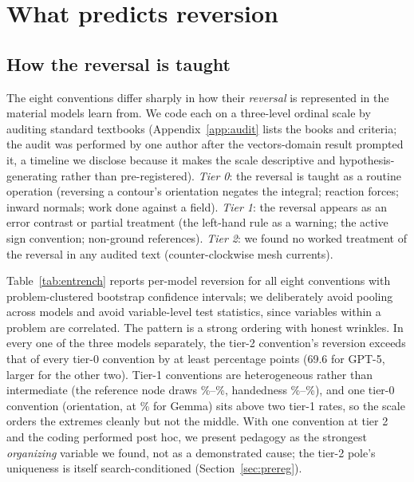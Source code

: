 \documentclass{article}
\begin{document}
\section{What predicts reversion}\label{sec:anatomy}

\subsection{How the reversal is taught}\label{sec:tier}
The eight conventions differ sharply in how their \emph{reversal} is represented
in the material models learn from. We code each on a three-level ordinal scale by
auditing standard textbooks (Appendix~\ref{app:audit} lists the books and
criteria; the audit was performed by one author after the vectors-domain result
prompted it, a timeline we disclose because it makes the scale descriptive and
hypothesis-generating rather than pre-registered). \emph{Tier 0}: the reversal is
taught as a routine operation (reversing a contour's orientation negates the
integral; reaction forces; inward normals; work done against a field).
\emph{Tier 1}: the reversal appears as an error contrast or partial treatment
(the left-hand rule as a warning; the active sign convention; non-ground
references). \emph{Tier 2}: we found no worked treatment of the reversal in any
audited text (counter-clockwise mesh currents).

Table~\ref{tab:entrench} reports per-model reversion for all eight conventions
with problem-clustered bootstrap confidence intervals; we deliberately avoid
pooling across models and avoid variable-level test statistics, since variables
within a problem are correlated. The pattern is a strong ordering with honest
wrinkles. In every one of the three models separately, the tier-2 convention's
reversion exceeds that of every tier-0 convention by at least \tierSepMinPrec{}
percentage points (69.6 for GPT-5, larger for the other two). Tier-1 conventions are heterogeneous rather than intermediate
(the reference node draws \topGptOss\%--\topGemma\%, handedness
\lhGptFive\%--\lhGemma\%), and one tier-0 convention (orientation, at
\cwGemma\% for Gemma) sits above two tier-1 rates, so the scale orders the
extremes cleanly but not the middle. With one convention at tier 2 and the coding
performed post hoc, we present pedagogy as the strongest \emph{organizing}
variable we found, not as a demonstrated cause; the tier-2 pole's uniqueness is
itself search-conditioned (Section~\ref{sec:prereg}).

\begin{table}[t]
\centering\small
\caption{Reversion for all eight conventions at each model's low-strain setting,
by reversal-pedagogy tier (0 = reversal taught as an operation, 1 = taught as an
error contrast or partial treatment, 2 = no worked treatment found). Confidence
intervals are 95\% bootstrap intervals clustering on the underlying problem.}
\label{tab:entrench}

\end{table}
\end{document}
